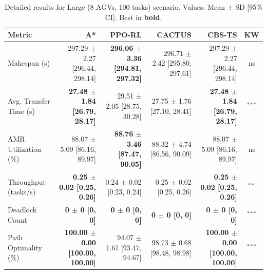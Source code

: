 \begin{table}[htbp]
\centering
\caption{Detailed results for Large (8 AGVs, 100 tasks) scenario. Values: Mean $\pm$ SD [95\% CI]. Best in \textbf{bold}.}
\label{tab:detail_s3_large}
\small
\begin{tabular}{@{}lrrrrc@{}}
\toprule
\textbf{Metric} & \textbf{A*} & \textbf{PPO-RL} & \textbf{CACTUS} & \textbf{CBS-TS} & \textbf{KW} \\
\midrule
Makespan (s) & 297.29 $\pm$ 2.27 [296.44, 298.14] & \textbf{296.06 $\pm$ 3.36 [294.81, 297.32]} & 296.71 $\pm$ 2.42 [295.80, 297.61] & 297.29 $\pm$ 2.27 [296.44, 298.14] & ns \\
Avg. Transfer Time (s) & \textbf{27.48 $\pm$ 1.84 [26.79, 28.17]} & 29.51 $\pm$ 2.05 [28.75, 30.28] & 27.75 $\pm$ 1.76 [27.10, 28.41] & \textbf{27.48 $\pm$ 1.84 [26.79, 28.17]} & $^{***}$ \\
AMR Utilization (\%) & 88.07 $\pm$ 5.09 [86.16, 89.97] & \textbf{88.76 $\pm$ 3.46 [87.47, 90.05]} & 88.32 $\pm$ 4.74 [86.56, 90.09] & 88.07 $\pm$ 5.09 [86.16, 89.97] & ns \\
Throughput (tasks/s) & \textbf{0.25 $\pm$ 0.02 [0.25, 0.26]} & 0.24 $\pm$ 0.02 [0.23, 0.24] & 0.25 $\pm$ 0.02 [0.25, 0.26] & \textbf{0.25 $\pm$ 0.02 [0.25, 0.26]} & $^{**}$ \\
Deadlock Count & \textbf{0 $\pm$ 0 [0, 0]} & \textbf{0 $\pm$ 0 [0, 0]} & \textbf{0 $\pm$ 0 [0, 0]} & \textbf{0 $\pm$ 0 [0, 0]} & $^{***}$ \\
Path Optimality (\%) & \textbf{100.00 $\pm$ 0.00 [100.00, 100.00]} & 94.07 $\pm$ 1.61 [93.47, 94.67] & 98.73 $\pm$ 0.68 [98.48, 98.98] & \textbf{100.00 $\pm$ 0.00 [100.00, 100.00]} & $^{***}$ \\
\bottomrule
\end{tabular}
\end{table}